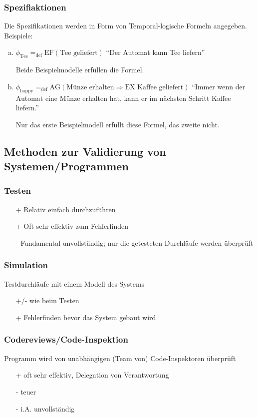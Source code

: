 \subsubsection*{Spezifiaktionen}
	Die Spezifikationen werden in Form von Temporal-logische Formeln angegeben. Beispiele:
	\begin{enumerate}[a)]
		\item $\phi_{\text{Tee}} =_{\text{def}} \text{EF}(\text{Tee geliefert})$ \hspace{2cm}\enquote{Der Automat kann Tee liefern}
		
		Beide Beispielmodelle erfüllen die Formel.
		
		\item $\phi_{\text{happy}} =_{\text{def}} \text{AG}(\text{Münze erhalten} \Rightarrow \text{EX Kaffee geliefert})$ \hspace{2cm}\enquote{Immer wenn der Automat eine Münze erhalten hat, kann er im nächsten Schritt Kaffee liefern.}
		
		Nur das erste Beispielmodell erfüllt diese Formel, das zweite nicht.
	\end{enumerate}

\subsection*{Methoden zur Validierung von Systemen/Programmen}
\subsubsection*{Testen}
\begin{itemize}
	\item[+] Relativ einfach durchzuführen
	\item[+] Oft sehr effektiv zum Fehlerfinden
	\item[-] Fundamental unvollständig; nur die getesteten Durchläufe werden überprüft
\end{itemize}

\subsubsection*{Simulation}
Testdurchläufe mit einem Modell des Systems
\begin{itemize}
	\item[+/-] wie beim Testen
	\item[+] Fehlerfinden bevor das System gebaut wird
\end{itemize}

\subsubsection*{Codereviews/Code-Inspektion}
Programm wird von unabhängigen (Team von) Code-Inspektoren überprüft
\begin{itemize}
	\item[+] oft sehr effektiv, Delegation von Verantwortung
	\item[-] teuer
	\item[-] i.A. unvollständig
\end{itemize}

